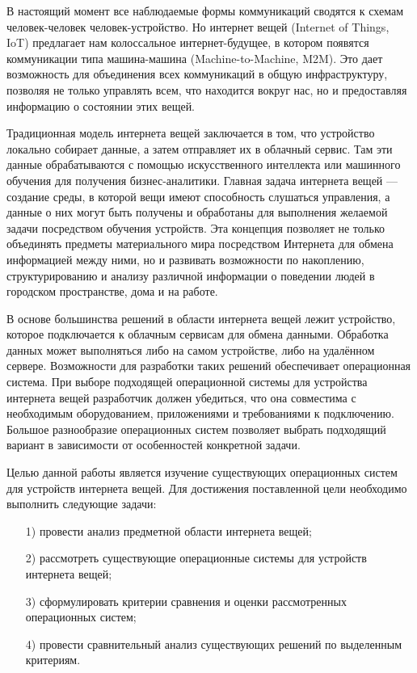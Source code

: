 \Introduction


В настоящий момент все наблюдаемые формы коммуникаций сводятся к схемам человек-человек  человек-устройство. Но интернет вещей (Internet of Things, IoT) предлагает нам колоссальное интернет-будущее, в котором появятся коммуникации типа машина-машина (Machine-to-Machine, M2M). Это дает возможность для объединения всех коммуникаций в общую инфраструктуру, позволяя не только управлять всем, что находится вокруг нас, но и предоставляя информацию о состоянии этих вещей. \cite{Dovgal}

Традиционная модель интернета вещей заключается в том, что устройство локально собирает данные, а затем отправляет их в облачный сервис. Там эти данные обрабатываются с помощью искусственного интеллекта или машинного обучения для получения бизнес-аналитики. Главная задача интернета вещей \cite{Markeeva} --- создание среды, в которой вещи имеют способность слушаться управления, а данные о них могут быть получены и обработаны для выполнения желаемой задачи посредством обучения устройств. Эта концепция позволяет не только объединять предметы материального мира посредством Интернета для обмена информацией между ними, но и развивать возможности по накоплению, структурированию и анализу различной информации о поведении людей в городском пространстве, дома и на работе.



В основе большинства решений в области интернета вещей лежит устройство, которое подключается к облачным сервисам для обмена данными. Обработка данных может выполняться либо на самом устройстве, либо на удалённом сервере. Возможности для разработки таких решений обеспечивает операционная система. При выборе подходящей операционной системы для устройства интернета вещей разработчик должен убедиться, что она совместима с необходимым оборудованием, приложениями и требованиями к подключению. Большое разнообразие операционных систем позволяет выбрать подходящий вариант в зависимости от особенностей конкретной задачи.

Целью данной работы является изучение существующих операционных систем для устройств интернета вещей. Для достижения поставленной цели необходимо выполнить следующие задачи:

\begin{enumerate}
	\item[1)] провести анализ предметной области интернета вещей;
	\item[2)] рассмотреть существующие операционные системы для устройств интернета вещей;
	\item[3)] сформулировать критерии сравнения и оценки рассмотренных операционных систем;
	\item[4)] провести сравнительный анализ существующих решений по выделенным критериям. 
\end{enumerate}

